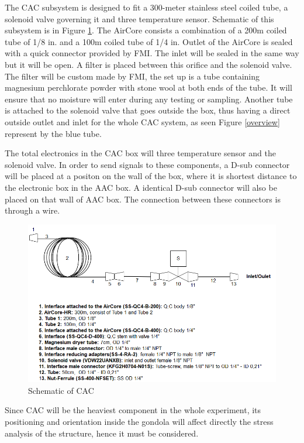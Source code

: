 The CAC subsystem is designed to fit a 300-meter stainless steel coiled tube, a solenoid valve governing it and three temperature sensor. Schematic of this subsystem is in Figure \ref{fig:CAC-schematic}. The AirCore consists a combination of a 200m coiled tube of 1/8 in. and a 100m coiled tube of 1/4 in. Outlet of the AirCore is sealed with a quick connector provided by FMI. The inlet will be sealed in the same way but it will be open. A filter is placed between this orifice and the solenoid valve. The filter will be custom made by FMI, the set up is a tube containing magnesium perchlorate powder with stone wool at both ends of the tube. It will ensure that no moisture will enter during any testing or sampling. Another tube is attached to the solenoid valve that goes outside the box, thus having a direct outside outlet and inlet for the whole CAC system, as seen Figure \ref{overview} represent by the blue tube.

\smallskip
The total electronics in the CAC box will three temperature sensor and the solenoid valve. In order to send signals to these components, a D-sub connector will be placed at a positon on the wall of the box, where it is shortest distance to the electronic box in the AAC box. A identical D-sub connector will also be placed on that wall of AAC box. The connection between these connectors is through a wire. 

\begin{figure}[h]
    \centering
    \includegraphics[width=1\textwidth]{4-experiment-design/img/CAC-schematic-v3.PNG}
    \caption{Schematic of CAC}
    \label{fig:CAC-schematic}
\end{figure}
Since CAC will be the heaviest component in the whole experiment, its positioning and orientation inside the gondola will affect directly the stress analysis of the structure, hence it must be considered.

